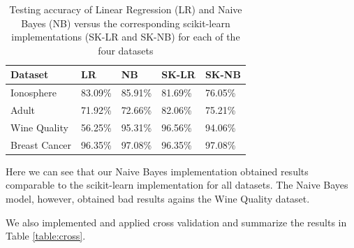 \documentclass[conference]{IEEEtran}
\begin{document}
\begin{table}
  \caption{Testing accuracy of Linear Regression (LR) and Naive Bayes (NB) versus the corresponding scikit-learn implementations (SK-LR and SK-NB) for each of the four datasets}
  \label{table:accuracy}
  \centering
  \begin{tabular}{lllll}
    \toprule
    Dataset       & LR   & NB   & SK-LR & SK-NB \\
    \midrule
    Ionosphere    & 83.09\% & 85.91\% & 81.69\% & 76.05\%  \\
    Adult         & 71.92\% & 72.66\% & 82.06\% & 75.21\%  \\
    Wine Quality  & 56.25\% & 95.31\% & 96.56\% & 94.06\%  \\
    Breast Cancer & 96.35\% & 97.08\% & 96.35\% & 97.08\%  \\
    \bottomrule
  \end{tabular}
\end{table}

Here we can see that our Naive Bayes implementation obtained results comparable to the scikit-learn implementation for all datasets. The Naive Bayes model, however, obtained bad results agains the Wine Quality dataset.

We also implemented and applied cross validation and summarize the results in Table \ref{table:cross}.
\end{document}
